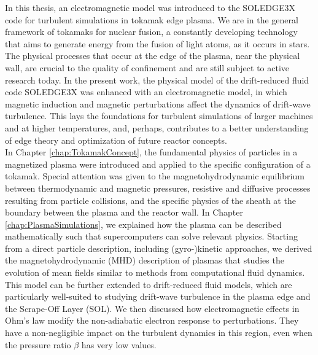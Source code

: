 In this thesis, an electromagnetic model was introduced to the SOLEDGE3X code for turbulent simulations in tokamak edge plasma. We are in the general framework of tokamaks for nuclear fusion, a constantly developing technology that aims to generate energy from the fusion of light atoms, as it occurs in stars. The physical processes that occur at the edge of the plasma, near the physical wall, are crucial to the quality of confinement and are still subject to active research today. In the present work, the physical model of the drift-reduced fluid code SOLEDGE3X was enhanced with an electromagnetic model, in which magnetic induction and magnetic perturbations affect the dynamics of drift-wave turbulence. This lays the foundations for turbulent simulations of larger machines and at higher temperatures, and, perhaps, contributes to a better understanding of edge theory and optimization of future reactor concepts. \\

In Chapter \ref{chap:TokamakConcept}, the fundamental physics of particles in a magnetized plasma were introduced and applied to the specific configuration of a tokamak. Special attention was given to the magnetohydrodynamic equilibrium between thermodynamic and magnetic pressures, resistive and diffusive processes resulting from particle collisions, and the specific physics of the sheath at the boundary between the plasma and the reactor wall. In Chapter \ref{chap:PlasmaSimulations}, we explained how the plasma can be described mathematically such that supercomputers can solve relevant physics. Starting from a direct particle description, including (gyro-)kinetic approaches, we derived the magnetohydrodynamic (MHD) description of plasmas that studies the evolution of mean fields similar to methods from computational fluid dynamics. This model can be further extended to drift-reduced fluid models, which are particularly well-suited to studying drift-wave turbulence in the plasma edge and the Scrape-Off Layer (SOL). We then discussed how electromagnetic effects in Ohm's law modify the non-adiabatic electron response to perturbations. They have a non-negligible impact on the turbulent dynamics in this region, even when the pressure ratio $\beta$ has very low values. \\

